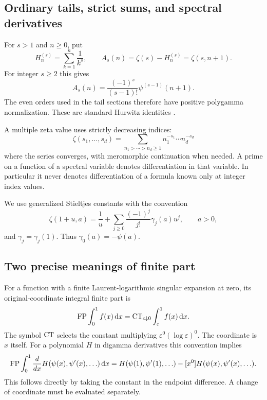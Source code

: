 \subsection{Ordinary tails, strict sums, and spectral derivatives}

For $s>1$ and $n\ge0$, put
\begin{equation}\label{scope:tails}
 H_n^{(s)}=\sum_{k=1}^n\frac1{k^s},\qquad
 A_s(n)=\zeta(s)-H_n^{(s)}=\zeta(s,n+1).
\end{equation}
For integer $s\ge2$ this gives
\[
 A_s(n)=\frac{(-1)^s}{(s-1)!}\psi^{(s-1)}(n+1).
\]
The even orders used in the tail sections therefore have positive
polygamma normalization. These are standard Hurwitz identities
\cite[Sections 5.15 and 25.11]{DLMF}.

A multiple zeta value uses strictly decreasing indices:
\[
 \zeta(s_1,\ldots,s_d)=
 \sum_{n_1>\cdots>n_d\ge1}
       n_1^{-s_1}\cdots n_d^{-s_d}
\]
where the series converges, with meromorphic continuation when needed.
A prime on a function of a spectral variable denotes differentiation
in that variable. In particular it never denotes differentiation of a
formula known only at integer index values.

We use generalized Stieltjes constants with the convention
\begin{equation}\label{scope:stieltjes}
 \zeta(1+u,a)=\frac1u+
       \sum_{j\ge0}\frac{(-1)^j}{j!}\gamma_j(a)u^j,
 \qquad a>0,
\end{equation}
and $\gamma_j=\gamma_j(1)$. Thus $\gamma_0(a)=-\psi(a)$.

\subsection{Two precise meanings of finite part}

For a function with a finite Laurent-logarithmic singular expansion at
zero, its original-coordinate integral finite part is
\begin{equation}\label{scope:fp}
 \operatorname{FP}\int_0^1f(x)\,\mathrm d x
 =\operatorname{CT}_{\varepsilon\downarrow0}
             \int_\varepsilon^1f(x)\,\mathrm d x.
\end{equation}
The symbol $\operatorname{CT}$ selects the constant multiplying
$\varepsilon^0(\log\varepsilon)^0$. The coordinate is $x$ itself.
For a polynomial $H$ in digamma derivatives this convention implies
\begin{equation}\label{scope:boundary}
 \operatorname{FP}\int_0^1\frac{d}{dx}H(\psi(x),\psi'(x),\ldots)\,\mathrm d x
 =H(\psi(1),\psi'(1),\ldots)
   -[x^0]H(\psi(x),\psi'(x),\ldots).
\end{equation}
This follows directly by taking the constant in the endpoint difference.
A change of coordinate must be evaluated separately.

